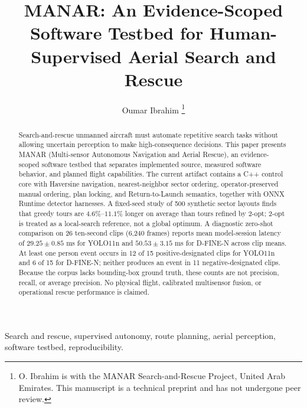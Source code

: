 \documentclass[journal]{IEEEtran}
\begin{document}
\title{MANAR: An Evidence-Scoped Software Testbed for Human-Supervised Aerial Search and Rescue}

\author{Oumar Ibrahim%
\thanks{O. Ibrahim is with the MANAR Search-and-Rescue Project, United Arab Emirates. This manuscript is a technical preprint and has not undergone peer review.}}


\maketitle

\begin{abstract}
\normalfont\small
Search-and-rescue unmanned aircraft must automate repetitive search tasks without allowing uncertain perception to make high-consequence decisions. This paper presents MANAR (Multi-sensor Autonomous Navigation and Aerial Rescue), an evidence-scoped software testbed that separates implemented source, measured software behavior, and planned flight capabilities. The current artifact contains a C++ control core with Haversine navigation, nearest-neighbor sector ordering, operator-preserved manual ordering, plan locking, and Return-to-Launch semantics, together with ONNX Runtime detector harnesses. A fixed-seed study of 500 synthetic sector layouts finds that greedy tours are $4.6\%$--$11.1\%$ longer on average than tours refined by 2-opt; 2-opt is treated as a local-search reference, not a global optimum. A diagnostic zero-shot comparison on 26 ten-second clips (6,240 frames) reports mean model-session latency of $29.25\pm0.85$ ms for YOLO11n and $50.53\pm3.15$ ms for D-FINE-N across clip means. At least one person event occurs in 12 of 15 positive-designated clips for YOLO11n and 6 of 15 for D-FINE-N; neither produces an event in 11 negative-designated clips. Because the corpus lacks bounding-box ground truth, these counts are not precision, recall, or average precision. No physical flight, calibrated multisensor fusion, or operational rescue performance is claimed.
\end{abstract}

\begin{IEEEkeywords}
\normalfont\small
Search and rescue, supervised autonomy, route planning, aerial perception, software testbed, reproducibility.
\end{IEEEkeywords}















\balance


\end{document}
